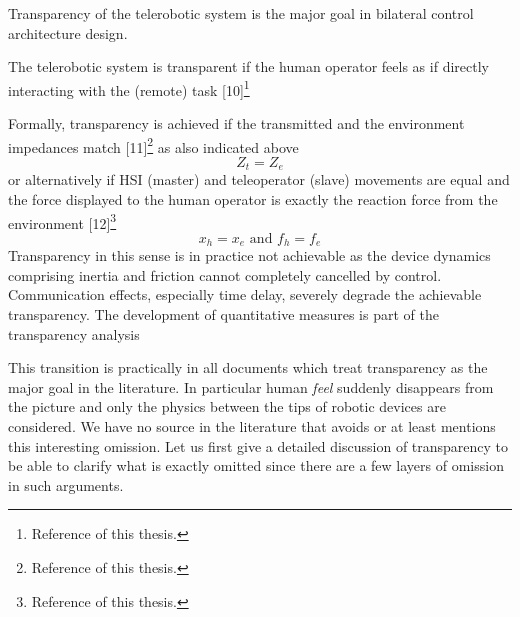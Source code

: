 \begin{displayquote}[][...]
Transparency of the telerobotic system is the major goal in bilateral control
architecture design.
\begin{define*}[Transparency] The telerobotic system is transparent if the human operator feels as if directly interacting with the (remote) 
task [10]\footnote{Reference \cite{rajuverg} of this thesis.}
\end{define*}
Formally, transparency is achieved if the transmitted and the environment impedances match [11]\footnote{Reference \cite{lawrence} of this
thesis.} as also indicated above
\[
Z_t=Z_e
\]
or alternatively if HSI (master) and teleoperator (slave) movements are equal and the force displayed to 
the human operator is exactly the reaction force from the environment [12]\footnote{Reference \cite{yokokohjiyoshikawa} of this thesis.}
\[
x_h = x_e\text{ and }f_h = f_e
\]
Transparency in this sense is in practice not achievable as the device dynamics comprising inertia and friction cannot completely 
cancelled by control. Communication effects, especially time delay, severely degrade the achievable transparency. The development of 
quantitative measures is part of the transparency analysis
\end{displayquote}
This transition is practically in all documents which treat transparency as the major goal in the literature. In particular human 
\emph{feel} suddenly disappears from the picture and only the physics between the tips of robotic devices are considered. We have no source 
in the literature that avoids or at least mentions this interesting omission. Let us first give a detailed discussion of transparency to be 
able to clarify what is exactly omitted since there are a few layers of omission in such arguments. 



